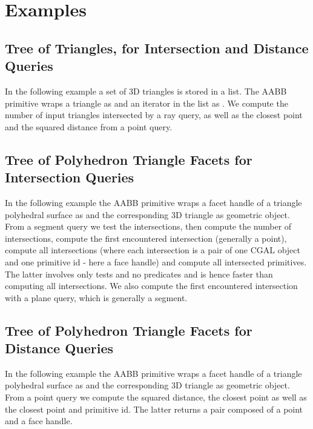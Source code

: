 \section{Examples}
\label{AABB_tree_section_examples}

\subsection{Tree of Triangles, for Intersection and Distance Queries}
In the following example a set of 3D triangles is stored in a list. The AABB primitive wraps a triangle as  and an iterator in the list as . We compute the number of input triangles intersected by a ray query, as well as the closest point and the squared distance from a point query.  

\subsection{Tree of Polyhedron Triangle Facets for Intersection Queries}
In the following example the AABB primitive wraps a facet handle of a triangle polyhedral surface as  and the corresponding 3D triangle as geometric object. From a segment query we test the intersections, then compute the number of intersections, compute the first encountered intersection (generally a point), compute all intersections (where each intersection is a pair of one CGAL object and one primitive id - here a face handle) and compute all intersected primitives. The latter involves only tests and no predicates and is hence faster than computing all intersections. We also compute the first encountered intersection with a plane query, which is generally a segment.

\subsection{Tree of Polyhedron Triangle Facets for Distance Queries}
In the following example the AABB primitive wraps a facet handle of a triangle polyhedral surface as  and the corresponding 3D triangle as geometric object. From a point query we compute the squared distance, the closest point as well as the closest point and primitive id. The latter returns a pair composed of a point and a face handle. 

